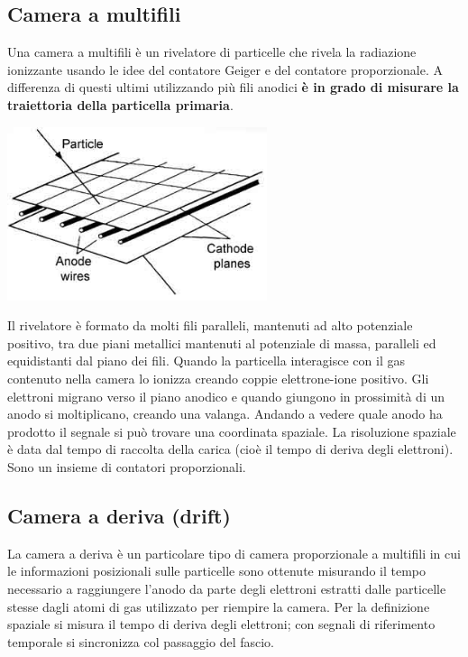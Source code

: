 \documentclass[a4paper,11pt,twoside,openany]{book}
\theoremstyle{definition}
\theoremstyle{plain}
\theoremstyle{plain}
\theoremstyle{definition}
\begin{document}
\subsection{Camera a multifili} %
Una camera a multifili è un rivelatore di particelle che rivela la radiazione ionizzante usando le idee del contatore Geiger e del contatore proporzionale. A differenza di questi ultimi utilizzando più fili anodici \textbf{è in grado di misurare la traiettoria della particella primaria}.

\begin{center}
\includegraphics[width=3in]{immagini/multifili.jpg} %
\end{center}

Il rivelatore è formato da molti fili paralleli, mantenuti ad alto potenziale positivo, tra due piani metallici mantenuti al potenziale di massa, paralleli ed equidistanti dal piano dei fili. Quando la particella interagisce con il gas contenuto nella camera lo ionizza creando coppie elettrone-ione positivo. Gli elettroni migrano verso il piano anodico e quando giungono in prossimità di un anodo si moltiplicano, creando una valanga. Andando a vedere quale anodo ha prodotto il segnale si può trovare una coordinata spaziale. La risoluzione spaziale è data dal tempo di raccolta della carica (cioè il tempo di deriva degli elettroni). Sono un insieme di contatori proporzionali.

\subsection{Camera a deriva (drift)} %
La camera a deriva è un particolare tipo di camera proporzionale a multifili in cui le informazioni posizionali sulle particelle sono ottenute misurando il tempo necessario a raggiungere l'anodo da parte degli elettroni estratti dalle particelle stesse dagli atomi di gas utilizzato per riempire la camera. Per la definizione spaziale si misura il tempo di deriva degli elettroni; con segnali di riferimento temporale si sincronizza col passaggio del fascio.
\end{document}
